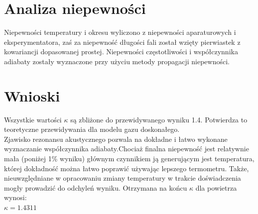 \documentclass[a4paper,10pt]{article}
\begin{document}
\section{Analiza niepewności}
Niepewności temperatury i okresu wyliczono z niepewności aparaturowych i eksperymentatora, zaś za niepewność długości fali został wzięty pierwiastek z kowariancji dopasowanej prostej. Niepewności częstotliwości i współczynnika adiabaty zostały wyznaczone przy użyciu metody propagacji niepewności.

\section{Wnioski}
Wszystkie wartości $\kappa$ są zbliżone do przewidywanego wyniku 1.4. Potwierdza to teoretyczne przewidywania dla modelu gazu doskonałego.
\\
Zjawisko rezonansu akustycznego pozwala na dokładne i łatwo wykonane wyznaczanie współczynnika adiabaty.Chociaż finalna niepewność jest relatywnie mała (poniżej 1\% wyniku) głównym czynnikiem ją generującym jest temperatura, której dokładność można łatwo poprawić używając lepszego termometru. Także, nieuwzględniane w opracowaniu zmiany temperatury w trakcie doświadczenia mogły prowadzić do odchyleń wyniku. Otrzymana na końcu $\kappa$ dla powietrza wynosi:
\\ $\kappa = 1.4311$\\
\end{document}
